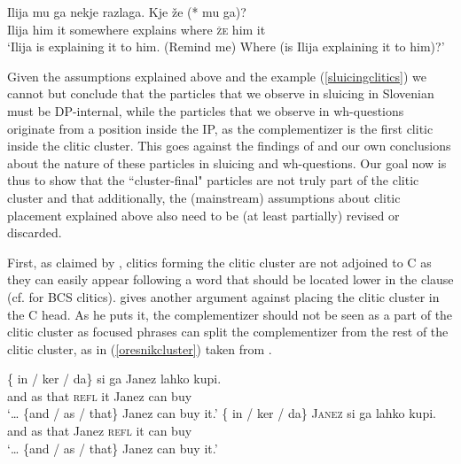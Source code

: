 \documentclass[output=paper,
modfonts,
newtxmath,
hidelinks
]{langscibook}
\begin{document}
\begin{exe}
\ex \label{sluicingclitics}
\gll Ilija mu ga nekje razlaga. Kje že (*\hspace{-2pt} mu ga)?\\
 	Ilija him it somewhere explains where \textsc{že} {} him it\\
 \trans `Ilija is explaining it to him. (Remind me) Where (is Ilija  explaining it to him)?'
\end{exe}

\noindent Given the assumptions explained above and the example (\ref{sluicingclitics}) we cannot but conclude that the particles that we observe in sluicing in Slovenian must be DP-internal, while the particles that we observe in wh-questions originate from a position inside the IP, as the complementizer is the first clitic inside the clitic cluster. This goes against the findings of \cite{marusicetal2015} and our own conclusions about the nature of these particles in sluicing and wh-questions. Our goal now is thus to show that the ``cluster-final" particles are not truly part of the clitic cluster and that additionally, the (mainstream) assumptions about clitic placement explained above also need to be (at least partially) revised or discarded.

First, as claimed by \cite{marusic2008clitics}, clitics forming the clitic cluster are not adjoined to C as they can easily appear following a word that should be located lower in the clause (cf. \citealt{boskovic2001} for BCS clitics). \cite{oresnik1985naniz} gives another argument against placing the clitic cluster in the C head. As he puts it, the complementizer should not be seen as a part of the clitic cluster as focused phrases can split the complementizer from the rest of the clitic cluster, as in (\ref{oresnikcluster}) taken from \cite{oresnik1985naniz}.

\begin{exe}
\ex \begin{xlist}
\ex \gll {\dots} \{\hspace{-2pt} in / ker / da\} si ga Janez lahko kupi.\\
	{} {} and {} as {} that 	\textsc{refl} it Janez can buy\\
\trans   `{\dots} \{and / as / that\} Janez can buy it.'
\ex \label{oresnikcluster}
\gll	{\dots} \{\hspace{-2pt} in / ker / da\} \textsc{Janez} si ga lahko kupi.\\
	{} {} and {} as {} that Janez \textsc{refl} it can buy\\
\trans `{\dots} \{and / as / that\} Janez can buy it.'
\end{xlist}\end{exe}
\end{document}
